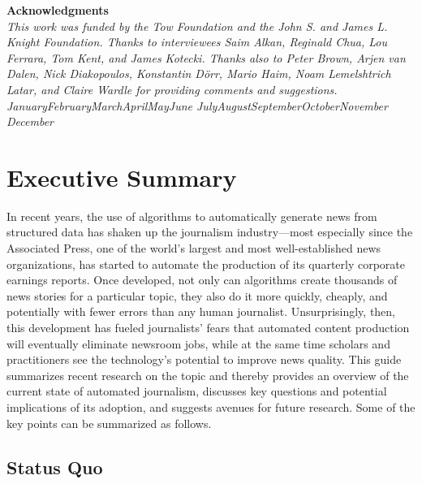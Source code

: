 \documentclass[notoc, symmetric, nobib, nols]{towcenter-guideto-book}
\newcommand{\monthyear}{%
  \ifcase\month\or January\or February\or March\or April\or May\or June\or
  July\or August\or September\or October\or November\or
  December\fi\space\number\year
}
\newcommand{\blankpage}{\newpage\hbox{}\thispagestyle{empty}\newpage}
\begin{document}
\blankpage
\blankpage


\null
\begin{fullwidth}
\noindent\textsf{\textbf{Acknowledgments}} \\[0.3cm]
\noindent\textit{This work was funded by the Tow Foundation and the John S. and James L. Knight Foundation. Thanks to interviewees Saim Alkan, Reginald Chua, Lou Ferrara, Tom Kent, and James Kotecki. Thanks also to Peter Brown, Arjen van Dalen, Nick Diakopoulos, Konstantin Dörr, Mario Haim, Noam Lemelshtrich Latar, and Claire Wardle for providing comments and suggestions.
}\\[0.1cm]
\noindent\textit{\monthyear}
\end{fullwidth}
\tableofcontents


\cleardoublepage


\mainmatter
\chapter{Executive Summary}

In recent years, the use of algorithms to automatically generate news from structured data has shaken up the journalism industry---most especially since the Associated Press, one of the world's largest and most well-established news organizations, has started to automate the production of its quarterly corporate earnings reports. Once developed, not only can algorithms create thousands of news stories for a particular topic, they also do it more quickly, cheaply, and potentially with fewer errors than any human journalist. Unsurprisingly, then, this development has fueled journalists' fears that automated content production will eventually eliminate newsroom jobs, while at the same time scholars and practitioners see the technology's potential to improve news quality. This guide summarizes recent research on the topic and thereby provides an overview of the current state of automated journalism, discusses key questions and potential implications of its adoption, and suggests avenues for future research. Some of the key points can be summarized as follows.

\section{Status Quo}
\end{document}
